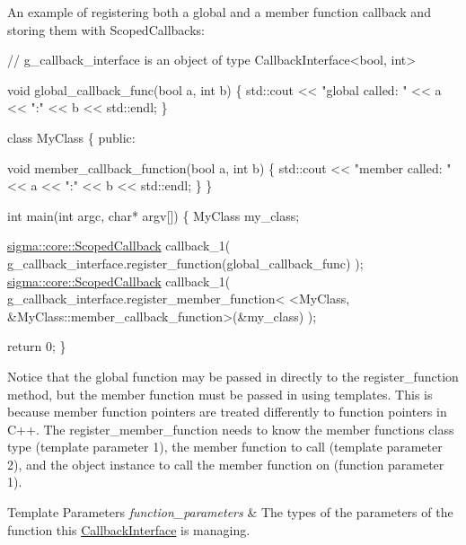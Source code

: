 An example of registering both a global and a member function callback and storing them with Scoped\-Callbacks\-:


\begin{DoxyCode}
\textcolor{comment}{// g\_callback\_interface is an object of type CallbackInterface<bool, int>}

\textcolor{keywordtype}{void} global\_callback\_func(\textcolor{keywordtype}{bool} a, \textcolor{keywordtype}{int} b)
\{
    std::cout << \textcolor{stringliteral}{"global called: "} << a << \textcolor{stringliteral}{":"} << b << std::endl;
\}

\textcolor{keyword}{class }MyClass
\{
\textcolor{keyword}{public}:

    \textcolor{keywordtype}{void} member\_callback\_function(\textcolor{keywordtype}{bool} a, \textcolor{keywordtype}{int} b)
    \{
        std::cout << \textcolor{stringliteral}{"member called: "} << a << \textcolor{stringliteral}{":"} << b << std::endl;
    \}
\}

\textcolor{keywordtype}{int} main(\textcolor{keywordtype}{int} argc, \textcolor{keywordtype}{char}* argv[])
\{
    MyClass my\_class;

    \hyperlink{classsigma_1_1core_1_1_scoped_callback}{sigma::core::ScopedCallback} callback\_1(
            g\_callback\_interface.register\_function(global\_callback\_func)
    );
    \hyperlink{classsigma_1_1core_1_1_scoped_callback}{sigma::core::ScopedCallback} callback\_1(
            g\_callback\_interface.register\_member\_function<
                    <MyClass, &MyClass::member\_callback\_function>(&my\_class)
    );

    \textcolor{keywordflow}{return} 0;
\}
\end{DoxyCode}


Notice that the global function may be passed in directly to the {\ttfamily register\-\_\-function method}, but the member function must be passed in using templates. This is because member function pointers are treated differently to function pointers in C++. The {\ttfamily register\-\_\-member\-\_\-function} needs to know the member functions class type (template parameter 1), the member function to call (template parameter 2), and the object instance to call the member function on (function parameter 1).


\begin{DoxyTemplParams}{Template Parameters}
{\em function\-\_\-parameters} & The types of the parameters of the function this \hyperlink{classsigma_1_1core_1_1_callback_interface}{Callback\-Interface} is managing. \\
\hline
\end{DoxyTemplParams}


